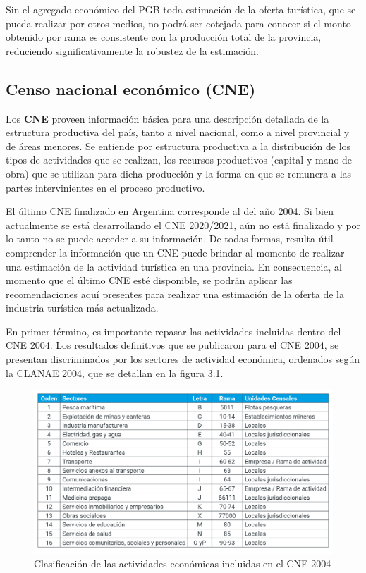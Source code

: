 \documentclass[
  openany]{book}
\begin{document}
Sin el agregado económico del PGB toda estimación de la oferta turística, que se pueda realizar por otros medios, no podrá ser cotejada para conocer si el monto obtenido por rama es consistente con la producción total de la provincia, reduciendo significativamente la robustez de la estimación.

\hypertarget{censo-nacional-econuxf3mico-cne}{%
\subsection{Censo nacional económico (CNE)}\label{censo-nacional-econuxf3mico-cne}}

Los \textbf{CNE} proveen información básica para una descripción detallada de la estructura productiva del país, tanto a nivel nacional, como a nivel provincial y de áreas menores. Se entiende por estructura productiva a la distribución de los tipos de actividades que se realizan, los recursos productivos (capital y mano de obra) que se utilizan para dicha producción y la forma en que se remunera a las partes intervinientes en el proceso productivo.

El último CNE finalizado en Argentina corresponde al del año 2004. Si bien actualmente se está desarrollando el CNE 2020/2021, aún no está finalizado y por lo tanto no se puede acceder a su información. De todas formas, resulta útil comprender la información que un CNE puede brindar al momento de realizar una estimación de la actividad turística en una provincia. En consecuencia, al momento que el último CNE esté disponible, se podrán aplicar las recomendaciones aquí presentes para realizar una estimación de la oferta de la industria turística más actualizada.

En primer término, es importante repasar las actividades incluidas dentro del CNE 2004. Los resultados definitivos que se publicaron para el CNE 2004, se presentan discriminados por los sectores de actividad económica, ordenados según la CLANAE 2004, que se detallan en la figura 3.1.

\begin{figure}

{\centering \includegraphics[width=1\linewidth]{imagenes/figura3.12} 

}

\caption{Clasificación de las actividades económicas incluidas en el CNE 2004}\label{fig:empleofuentes12}
\end{figure}
\end{document}
